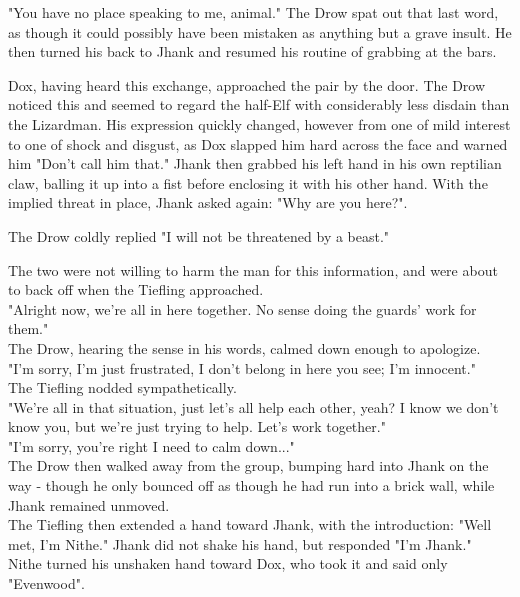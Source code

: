 \documentclass[letterpaper,10pt,twoside,twocolumn,openany]{book}
\begin{document}

"You have no place speaking to me, animal." The Drow spat out that last word, as though it could possibly have been mistaken as anything but a grave insult. He then turned his back to Jhank and resumed his routine of grabbing at the bars.

Dox, having heard this exchange, approached the pair by the door. The Drow noticed this and seemed to regard the half-Elf with considerably less disdain than the Lizardman. His expression quickly changed, however from one of mild interest to one of shock and disgust, as Dox slapped him hard across the face and warned him "Don't call him that." Jhank then grabbed his left hand in his own reptilian claw, balling it up into a fist before enclosing it with his other hand. With the implied threat in place, Jhank asked again: "Why are you here?".

The Drow coldly replied "I will not be threatened by a beast."

The two were not willing to harm the man for this information, and were about to back off when the Tiefling approached.\\
"Alright now, we're all in here together. No sense doing the guards' work for them."\\
The Drow, hearing the sense in his words, calmed down enough to apologize.\\
"I'm sorry, I'm just frustrated, I don't belong in here you see; I'm innocent."\\
The Tiefling nodded sympathetically.\\
"We're all in that situation, just let's all help each other, yeah? I know we don't know you, but we're just trying to help. Let's work together."\\
"I'm sorry, you're right I need to calm down..."\\
The Drow then walked away from the group, bumping hard into Jhank on the way - though he only bounced off as though he had run into a brick wall, while Jhank remained unmoved.\\
The Tiefling then extended a hand toward Jhank, with the introduction: "Well met, I'm Nithe." Jhank did not shake his hand, but responded "I'm Jhank."\\
Nithe turned his unshaken hand toward Dox, who took it and said only "Evenwood".
\end{document}
